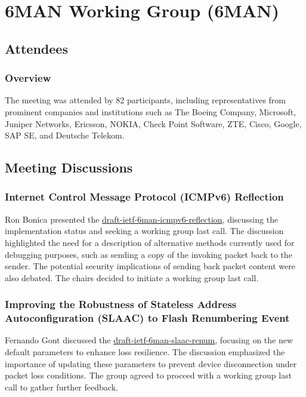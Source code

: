 \documentclass{article}
\begin{document}
\newpage

\section{6MAN Working Group (6MAN)}

\subsection{Attendees}
\subsubsection{Overview}
The meeting was attended by 82 participants, including representatives from prominent companies and institutions such as The Boeing Company, Microsoft, Juniper Networks, Ericsson, NOKIA, Check Point Software, ZTE, Cisco, Google, SAP SE, and Deutsche Telekom.

\subsection{Meeting Discussions}

\subsubsection{Internet Control Message Protocol (ICMPv6) Reflection}
Ron Bonica presented the \href{https://datatracker.ietf.org/doc/html/draft-ietf-6man-icmpv6-reflection}{draft-ietf-6man-icmpv6-reflection}, discussing the implementation status and seeking a working group last call. The discussion highlighted the need for a description of alternative methods currently used for debugging purposes, such as sending a copy of the invoking packet back to the sender. The potential security implications of sending back packet content were also debated. The chairs decided to initiate a working group last call.

\subsubsection{Improving the Robustness of Stateless Address Autoconfiguration (SLAAC) to Flash Renumbering Event}
Fernando Gont discussed the \href{https://datatracker.ietf.org/doc/html/draft-ietf-6man-slaac-renum}{draft-ietf-6man-slaac-renum}, focusing on the new default parameters to enhance loss resilience. The discussion emphasized the importance of updating these parameters to prevent device disconnection under packet loss conditions. The group agreed to proceed with a working group last call to gather further feedback.
\end{document}
